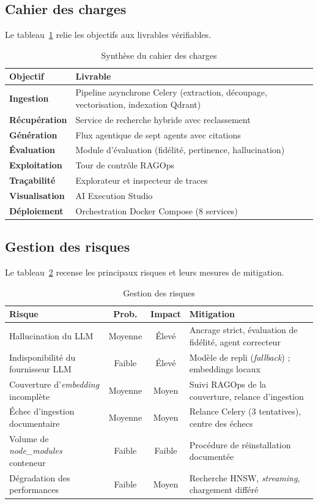 \subsection{Cahier des charges}
Le tableau~\ref{tab:cdc} relie les objectifs aux livrables vérifiables.

\begin{table}[H]
\centering\caption{Synthèse du cahier des charges}\label{tab:cdc}\small
\begin{tabularx}{\textwidth}{@{}>{\bfseries}l X@{}}
\toprule
Objectif & Livrable \\
\midrule
Ingestion & Pipeline asynchrone Celery (extraction, découpage, vectorisation, indexation Qdrant) \\
Récupération & Service de recherche hybride avec reclassement \\
Génération & Flux agentique de sept agents avec citations \\
Évaluation & Module d'évaluation (fidélité, pertinence, hallucination) \\
Exploitation & Tour de contrôle RAGOps \\
Traçabilité & Explorateur et inspecteur de traces \\
Visualisation & AI Execution Studio \\
Déploiement & Orchestration Docker Compose (8 services) \\
\bottomrule
\end{tabularx}
\end{table}

\subsection{Gestion des risques}
Le tableau~\ref{tab:risques} recense les principaux risques et leurs mesures de
mitigation.

\begin{table}[H]
\centering\caption{Gestion des risques}\label{tab:risques}\small
\begin{tabularx}{\textwidth}{@{}X c c X@{}}
\toprule
\textbf{Risque} & \textbf{Prob.} & \textbf{Impact} & \textbf{Mitigation} \\
\midrule
Hallucination du LLM & Moyenne & Élevé & Ancrage strict, évaluation de fidélité, agent correcteur \\
Indisponibilité du fournisseur LLM & Faible & Élevé & Modèle de repli (\emph{fallback}) ; embeddings locaux \\
Couverture d'\emph{embedding} incomplète & Moyenne & Moyen & Suivi RAGOps de la couverture, relance d'ingestion \\
Échec d'ingestion documentaire & Moyenne & Moyen & Relance Celery (3 tentatives), centre des échecs \\
Volume de \emph{node\_modules} conteneur & Faible & Faible & Procédure de réinstallation documentée \\
Dégradation des performances & Faible & Moyen & Recherche HNSW, \emph{streaming}, chargement différé \\
\bottomrule
\end{tabularx}
\end{table}

